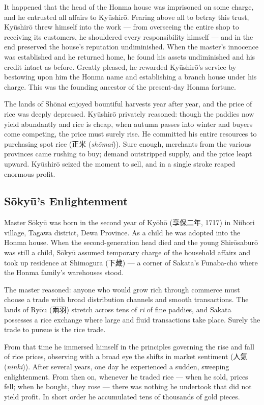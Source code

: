 \documentclass[10pt, openany]{book}
\newcommand{\jp}[1]{{\japanesefont #1}}
\newcommand{\jt}[2]{\jp{#1} (\textit{#2})}
\begin{document}
It happened that the head of the Honma house was imprisoned on some
charge, and he entrusted all affairs to Ky\=ushir\=o. Fearing above all
to betray this trust, Ky\=ushir\=o threw himself into the work --- from
overseeing the entire shop to receiving its customers, he shouldered
every responsibility himself --- and in the end preserved the house's
reputation undiminished. When the master's innocence was established and
he returned home, he found his assets undiminished and his credit intact
as before. Greatly pleased, he rewarded Ky\=ushir\=o's service by
bestowing upon him the Honma name and establishing a branch house under
his charge. This was the founding ancestor of the present-day Honma
fortune.

The lands of Sh\=onai enjoyed bountiful harvests year after year, and
the price of rice was deeply depressed. Ky\=ushir\=o privately reasoned:
though the paddies now yield abundantly and rice is cheap, when autumn
passes into winter and buyers come competing, the price must surely
rise. He committed his entire resources to purchasing spot rice
(\jt{正米}{sh\=omai}). Sure enough, merchants from the various
provinces came rushing to buy; demand outstripped supply, and the price
leapt upward. Ky\=ushir\=o seized the moment to sell, and in a single
stroke reaped enormous profit.

\subsection*{S\=oky\=u's Enlightenment}

Master S\=oky\=u was born in the second year of Ky\=oh\=o (\jp{享保二年},
1717) in Niibori village, Tagawa district, Dewa Province. As a child he
was adopted into the Honma house. When the second-generation head died
and the young Shir\=osaburō was still a child, S\=oky\=u assumed
temporary charge of the household affairs and took up residence at
Shimogura (\jp{下藏}) --- a corner of Sakata's Funaba-ch\=o where the
Honma family's warehouses stood.

The master reasoned: anyone who would grow rich through commerce must
choose a trade with broad distribution channels and smooth transactions.
The lands of Ry\=ou (\jp{兩羽}) stretch across tens of \textit{ri} of
fine paddies, and Sakata possesses a rice exchange where large and fluid
transactions take place. Surely the trade to pursue is the rice trade.

From that time he immersed himself in the principles governing the rise
and fall of rice prices, observing with a broad eye the shifts in market
sentiment (\jt{人氣}{ninki}). After several years, one day he
experienced a sudden, sweeping enlightenment. From then on, whenever he
traded rice --- when he sold, prices fell; when he bought, they rose ---
there was nothing he undertook that did not yield profit. In short order
he accumulated tens of thousands of gold pieces.
\end{document}
